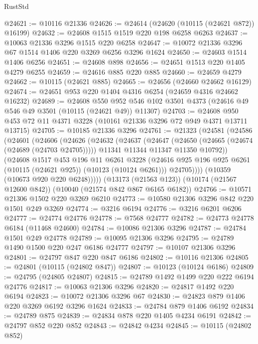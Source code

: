 \begin{lexlean}{RustStd}
\begin{coremodule}
@24621 := @10116 @21336
@24626 := @24614 (@24620 (@10115 (@24621 @872)) @16199)
@24632 := @24608 @1515 @1519 @220 @198 @6258 @6263
@24637 := @10063 @21336 @3296 @1515 @220 @6258
@24647 := @10072 @21336 @3296 @67 @1514 @1406 @220 @3269 @6256 @3296 @1624
@24650 := @24603 @1514 @1406 @6256
@24651 := @24608 @898
@24656 := @24651 @1513 @220 @1405 @4279 @6255
@24659 := @24616 @885 @220 @885
@24660 := @24659 @4279
@24662 := @10115 (@24621 @885)
@24665 := @24656 (@24660 @24662 @16129)
@24674 := @24651 @953 @220 @1404 @4316 @6254 (@24659 @4316 @24662 @16232)
@24689 := @24608
    @550
    @952
    @546
    @102
    @3501
    @4373
    (@24616 @49 @546 @49 @3501 (@10115 (@24621 @49)) @11307)
@24703 := @24608 @950 @453 @72 @11 @4371 @3228 (@10161 @21336 @3296 @72 @949 @4371 @13711 @13715)
@24705 := @10185 @21336 @3296
@24761 := @21323
    (@24581
      (@24586
        (@24601
          (@24606
            (@24626
              (@24632
                (@24637
                  (@24647
                    (@24650 (@24665 (@24674 (@24689 (@24703 @24705)))))
                    @11341
                    @11344
                    @11347
                    @11350
                    @10792))
                (@24608
                  @1517
                  @453
                  @196
                  @11
                  @6261
                  @3228
                  (@24616 @925 @196 @925 @6261 (@10115 (@24621 @925)) (@10123 (@10124 @6261)))
                  @24705))))
          (@10359 (@10673 @920 @220 @6248)))))
    (@13173 (@21563 @123))
    (@10174 (@21567 @12600 @842))
    (@10040 (@21574 @842 @867 @6165 @6182))
@24766 := @10571 @21306 @1502 @220 @3269 @6210
@24773 := @10580 @21306 @3296 @842 @220 @1501 @249 @3269
@24774 := @3216 @6194
@24776 := @3216 @6201 @6206
@24777 := @24774 @24776
@24778 := @7568 @24777
@24782 := @24773 @24778 @6184 (@11468 @24600)
@24784 := @10086 @21306 @3296
@24787 := @24784 @1501 @249 @24778
@24789 := @10095 @21306 @3296
@24795 := @24789 @1490 @1500 @220 @247 @6186 @24777
@24797 := @10107 @21306 @3296
@24801 := @24797 @847 @220 @847 @6186
@24802 := @10116 @21306
@24805 := @24801 (@10115 (@24802 @847))
@24807 := @10123 (@10124 @6186)
@24809 := @24795 (@24805 @24807)
@24815 := @24789 @1492 @1499 @220 @222 @6194 @24776
@24817 := @10063 @21306 @3296
@24820 := @24817 @1492 @220 @6194
@24823 := @10072 @21306 @3296 @67
@24830 := @24823 @879 @1406 @220 @3269 @6192 @3296 @1624
@24833 := @24784 @879 @1406 @6192
@24834 := @24789 @875
@24839 := @24834 @878 @220 @1405 @4234 @6191
@24842 := @24797 @852 @220 @852
@24843 := @24842 @4234
@24845 := @10115 (@24802 @852)

\end{coremodule}
\end{lexlean}

